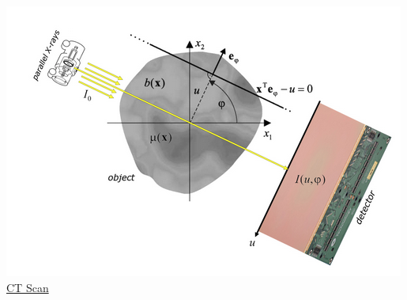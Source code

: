 \begin{frame}[c]
\begin{minipage}[t]{0.25\textwidth}
		\includegraphics[width=\textwidth]{media/ct_scan.png}\\
		\hyperref{https://en.wikipedia.org/wiki/CT_scan}{}{}{CT Scan} 
	\end{minipage}
\end{frame}
%
